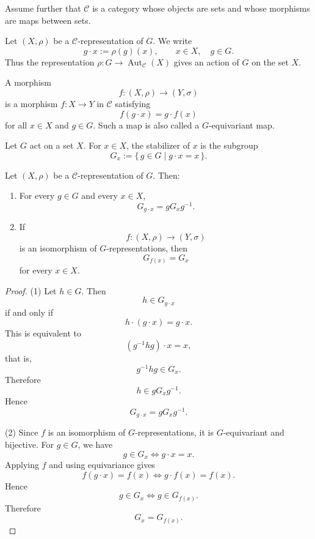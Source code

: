 Assume further that \(\mathcal{C}\) is a category whose objects are sets and whose
morphisms are maps between sets.

Let \((X,\rho)\) be a \(\mathcal{C}\)-representation of \(G\). We write
\[
    g\cdot x := \rho(g)(x),
    \qquad x\in X,\quad g\in G.
\]
Thus the representation \(\rho:G\to \operatorname{Aut}_{\mathcal{C}}(X)\) gives an
action of \(G\) on the set \(X\).

A morphism
\[
    f:(X,\rho)\longrightarrow (Y,\sigma)
\]
is a morphism \(f:X\to Y\) in \(\mathcal{C}\) satisfying
\[
    f(g\cdot x)=g\cdot f(x)
\]
for all \(x\in X\) and \(g\in G\). Such a map is also called a \(G\)-equivariant
map.

\begin{definition}
    Let \(G\) act on a set \(X\). For \(x\in X\), the stabilizer of \(x\) is the
    subgroup
    \[
        G_x:=\{\,g\in G\mid g\cdot x=x\,\}.
    \]
\end{definition}

\begin{lemma}
    Let \((X,\rho)\) be a \(\mathcal{C}\)-representation of \(G\). Then:
    \begin{enumerate}
        \item For every \(g\in G\) and every \(x\in X\),
        \[
            G_{g\cdot x}=gG_xg^{-1}.
        \]

        \item If
        \[
            f:(X,\rho)\longrightarrow (Y,\sigma)
        \]
        is an isomorphism of \(G\)-representations, then
        \[
            G_{f(x)}=G_x
        \]
        for every \(x\in X\).
    \end{enumerate}
\end{lemma}

\begin{proof}
    \textup{(1)} Let \(h\in G\). Then
    \[
        h\in G_{g\cdot x}
    \]
    if and only if
    \[
        h\cdot (g\cdot x)=g\cdot x.
    \]
    This is equivalent to
    \[
        (g^{-1}hg)\cdot x=x,
    \]
    that is,
    \[
        g^{-1}hg\in G_x.
    \]
    Therefore
    \[
        h\in gG_xg^{-1}.
    \]
    Hence
    \[
        G_{g\cdot x}=gG_xg^{-1}.
    \]

    \textup{(2)} Since \(f\) is an isomorphism of \(G\)-representations, it is
    \(G\)-equivariant and bijective. For \(g\in G\), we have
    \[
        g\in G_x
        \iff g\cdot x=x.
    \]
    Applying \(f\) and using equivariance gives
    \[
        f(g\cdot x)=f(x)
        \iff g\cdot f(x)=f(x).
    \]
    Hence
    \[
        g\in G_x
        \iff g\in G_{f(x)}.
    \]
    Therefore
    \[
        G_x=G_{f(x)}.
    \]
\end{proof}

